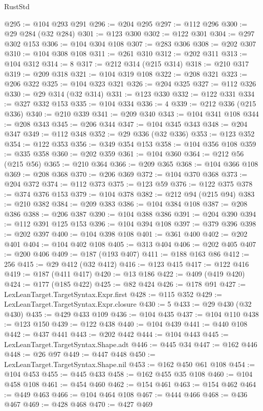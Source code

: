 \begin{lexlean}{RustStd}
\begin{coremodule}
@295 := @104 @293 @291
@296 := @204 @295
@297 := @112 @296
@300 := @29 @284 (@32 @284)
@301 := @123 @300
@302 := @122 @301
@304 := @297 @302 @153
@306 := @104 @304 @108
@307 := @283 @306
@308 := @202 @307
@310 := @104 @308 @108
@311 := @261 @310
@312 := @202 @311
@313 := @104 @312
@314 := 8
@317 := @212 @314 (@215 @314)
@318 := @210 @317
@319 := @209 @318
@321 := @104 @319 @108
@322 := @208 @321
@323 := @206 @322
@325 := @104 @323 @321
@326 := @204 @325
@327 := @112 @326
@330 := @29 @314 (@32 @314)
@331 := @123 @330
@332 := @122 @331
@334 := @327 @332 @153
@335 := @104 @334
@336 := 4
@339 := @212 @336 (@215 @336)
@340 := @210 @339
@341 := @209 @340
@343 := @104 @341 @108
@344 := @208 @343
@345 := @206 @344
@347 := @104 @345 @343
@348 := @204 @347
@349 := @112 @348
@352 := @29 @336 (@32 @336)
@353 := @123 @352
@354 := @122 @353
@356 := @349 @354 @153
@358 := @104 @356 @108
@359 := @335 @358
@360 := @202 @359
@361 := @104 @360
@364 := @212 @56 (@215 @56)
@365 := @210 @364
@366 := @209 @365
@368 := @104 @366 @108
@369 := @208 @368
@370 := @206 @369
@372 := @104 @370 @368
@373 := @204 @372
@374 := @112 @373
@375 := @123 @59
@376 := @122 @375
@378 := @374 @376 @153
@379 := @104 @378
@382 := @212 @94 (@215 @94)
@383 := @210 @382
@384 := @209 @383
@386 := @104 @384 @108
@387 := @208 @386
@388 := @206 @387
@390 := @104 @388 @386
@391 := @204 @390
@394 := @112 @391 @125 @153
@396 := @104 @394 @108
@397 := @379 @396
@398 := @202 @397
@400 := @104 @398 @108
@401 := @361 @400
@402 := @202 @401
@404 := @104 @402 @108
@405 := @313 @404
@406 := @202 @405
@407 := @200 @406
@409 := @187 (@193 @407)
@411 := @188 @163 @86
@412 := 256
@415 := @29 @412 (@32 @412)
@416 := @123 @415
@417 := @122 @416
@419 := @187 (@411 @417)
@420 := @13 @186
@422 := @409 (@419 @420)
@424 := @177 (@185 @422)
@425 := @82 @424
@426 := @178 @91
@427 := LexLeanTarget.TargetSyntax.Expr.first
@428 := @115 @352
@429 := LexLeanTarget.TargetSyntax.Expr.closure
@430 := 5
@433 := @29 @430 (@32 @430)
@435 := @429 @433 @109
@436 := @104 @435
@437 := @104 @110
@438 := @123 @150
@439 := @122 @438
@440 := @104 @439
@441 := @440 @108
@442 := @437 @441
@443 := @202 @442
@444 := @104 @443
@445 := LexLeanTarget.TargetSyntax.Shape.adt
@446 := @445 @34
@447 := @162 @446
@448 := @26 @97
@449 := @447 @448
@450 := LexLeanTarget.TargetSyntax.Shape.nil
@453 := @162 @450 @61 @108
@454 := @104 @453
@455 := @445 @433
@458 := @162 @455 @35 @108
@460 := @104 @458 @108
@461 := @454 @460
@462 := @154 @461
@463 := @154 @462
@464 := @449 @463
@466 := @104 @464 @108
@467 := @444 @466
@468 := @436 @467
@469 := @428 @468
@470 := @427 @469

\end{coremodule}
\end{lexlean}
